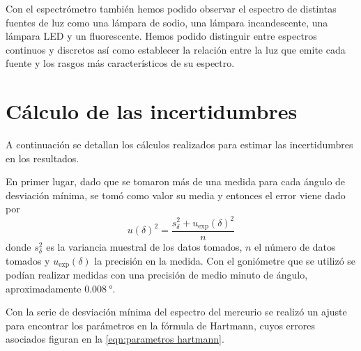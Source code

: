 \documentclass[12pt]{article}
\numberwithin{table}{section}
\numberwithin{figure}{section}
\numberwithin{equation}{section}
\begin{document}
Con el espectrómetro también hemos podido observar el espectro de distintas fuentes de luz como una lámpara de sodio, una lámpara incandescente, una lámpara LED y un fluorescente. Hemos podido distinguir entre espectros continuos y discretos así como establecer la relación entre la luz que emite cada fuente y los rasgos más característicos de su espectro.

\appendix
\section{Cálculo de las incertidumbres}\label{sec:errores}
A continuación se detallan los cálculos realizados para estimar las incertidumbres en los resultados.

En primer lugar, dado que se tomaron más de una medida para cada ángulo de desviación mínima, se tomó como valor su media y entonces el error viene dado por
\begin{equation} \label{eqn:error desviacion}
	u(\delta)^2 = \frac{s^2_{\delta} + u_\text{exp}(\delta)^2}{n}
\end{equation}
donde \( s^2_{\delta} \) es la variancia muestral de los datos tomados, \( n \) el número de datos tomados y \( u_\text{exp}(\delta) \) la precisión en la medida. Con el goniómetre que se utilizó se podían realizar medidas con una precisión de medio minuto de ángulo, aproximadamente \( \SI{0.008}{\degree} \).

Con la serie de desviación mínima del espectro del mercurio se realizó un ajuste para encontrar los parámetros en la fórmula de Hartmann, cuyos errores asociados figuran en la \cref{eqn:parametros hartmann}.
\end{document}
